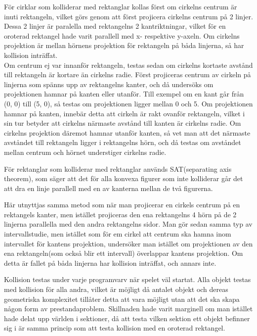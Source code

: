 \documentclass[12pt,a4paper]{article}
\newcounter{subsubsubsection}[subsubsection]
\begin{document}
För cirklar som kolliderar med rektanglar kollas först om cirkelns centrum är inuti rektangeln, vilket görs genom att först projicera cirkelns centrum på 2 linjer. Dessa 2 linjer är paralella med rektangelns 2 kantriktningar, vilket för en oroterad rektangel hade varit parallell med x- respektive y-axeln. Om cirkelns projektion är mellan hörnens projektion för rektangeln på båda linjerna, så har kollision inträffat. \\

Om centrum ej var innanför rektangeln, testas sedan om cirkelns kortaste avstånd till rektangeln är kortare än cirkelns radie. Först projiceras centrum av cirkeln på linjerna som spänns upp av rektangelns kanter, och då undersöks om projektionen hamnar på kanten eller utanför. Till exempel om en kant går från (0, 0) till (5, 0), så testas om projektionen ligger mellan 0 och 5. Om projektionen hamnar på kanten, innebär detta att cirkeln är rakt ovanför rektangeln, vilket i sin tur betyder att cirkelns närmaste avstånd till kanten är cirkelns radie. Om cirkelns projektion däremot hamnar utanför kanten, så vet man att det närmaste avståndet till rektangeln ligger i rektangelns hörn, och då testas om avståndet mellan centrum och hörnet understiger cirkelns radie.

\vspace{0.2cm}

För rektanglar som kolliderar med rektanglar används SAT(separating axis theorem), som säger att det för alla konvexa figurer som inte kolliderar går det att dra en linje parallell med en av kanterna mellan de två figurerna.

Här utnyttjas samma metod som när man projicerar en cirkels centrum på en rektangels kanter, men istället projiceras den ena rektangelns 4 hörn på de 2 linjerna parallella med den andra rektangelns sidor. Man gör sedan samma typ av intervallstudie, men istället som för em cirkel att centrum ska hamna inom intervallet för kantens projektion, undersöker man istället om projektionen av den ena rektangeln(som också blir ett intervall) överlappar kantens projektion. Om detta är fallet på båda linjerna har kollision inträffat, och annars inte.

Kollision testas under varje programvarv när spelet väl startat. Alla objekt testas med kollision för alla andra, vilket är möjligt då antalet objekt och dereas geometriska komplexitet tillåter detta att vara möjligt utan att det ska skapa någon form av prestandaproblem. Skillnaden hade varit marginell om man istället hade delat upp världen i sektioner, då att testa vilken sektion ett objekt befinner sig i är samma princip som att testa kollision med en oroterad rektangel. 
\end{document}
